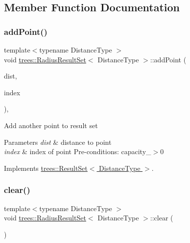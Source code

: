 \subsection{Member Function Documentation}
\mbox{\label{classtrees_1_1_radius_result_set_a65652623444c8beb35a1d27a86117b2a}} 
\subsubsection{\texorpdfstring{add\+Point()}{addPoint()}}
{\footnotesize\ttfamily template$<$typename Distance\+Type $>$ \\
void \hyperlink{classtrees_1_1_radius_result_set}{trees\+::\+Radius\+Result\+Set}$<$ Distance\+Type $>$\+::add\+Point (\begin{DoxyParamCaption}\item[{Distance\+Type}]{dist,  }\item[{size\+\_\+t}]{index }\end{DoxyParamCaption})\hspace{0.3cm}{\ttfamily [inline]}, {\ttfamily [virtual]}}

Add another point to result set 
\begin{DoxyParams}{Parameters}
{\em dist} & distance to point \\
\hline
{\em index} & index of point Pre-\/conditions\+: capacity\+\_\+$>$0 \\
\hline
\end{DoxyParams}


Implements \hyperlink{classtrees_1_1_result_set}{trees\+::\+Result\+Set$<$ Distance\+Type $>$}.

\mbox{\label{classtrees_1_1_radius_result_set_a4e41825c25577341937de798be4ab659}} 
\subsubsection{\texorpdfstring{clear()}{clear()}}
{\footnotesize\ttfamily template$<$typename Distance\+Type $>$ \\
void \hyperlink{classtrees_1_1_radius_result_set}{trees\+::\+Radius\+Result\+Set}$<$ Distance\+Type $>$\+::clear (\begin{DoxyParamCaption}{ }\end{DoxyParamCaption})\hspace{0.3cm}{\ttfamily [inline]}}

